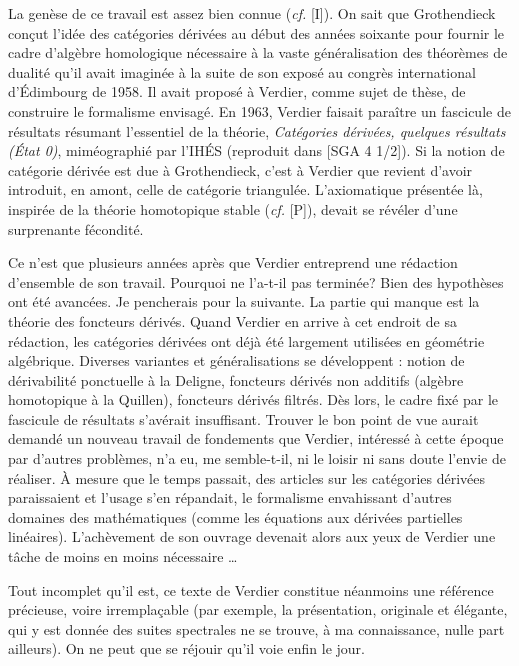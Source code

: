 La genèse de ce travail est assez bien connue (\emph{cf.} [I]). On sait que
Grothendieck conçut l'idée des catégories dérivées au début des années soixante
pour fournir le cadre d'algèbre homologique nécessaire à la vaste
généralisation des théorèmes de dualité qu'il avait imaginée à la suite de son
exposé au congrès international d'Édimbourg de 1958. Il avait proposé à
Verdier, comme sujet de thèse, de construire le formalisme envisagé. En 1963,
Verdier faisait paraître un fascicule de résultats résumant l'essentiel de la
théorie, \emph{Catégories dérivées, quelques résultats (État 0)}, miméographié
par l'IHÉS (reproduit dans [SGA 4 1/2]). Si la notion de catégorie dérivée est
due à Grothendieck, c'est à Verdier que revient d'avoir introduit, en amont,
celle de catégorie triangulée. L'axiomatique présentée là, inspirée de la
théorie homotopique stable (\emph{cf.} [P]), devait se révéler d'une surprenante
fécondité.

Ce n'est que plusieurs années après que Verdier entreprend une rédaction
d'ensemble de son travail. Pourquoi ne l'a-t-il pas terminée? Bien des
hypothèses ont été avancées. Je pencherais pour la suivante. La partie qui
manque est la théorie des foncteurs dérivés. Quand Verdier en arrive à cet
endroit de sa rédaction, les catégories dérivées ont déjà été largement
utilisées en géométrie algébrique. Diverses variantes et généralisations se
développent : notion de dérivabilité ponctuelle à la Deligne, foncteurs dérivés
non additifs (algèbre homotopique à la Quillen), foncteurs dérivés filtrés. Dès
lors, le cadre fixé par le fascicule de résultats s'avérait insuffisant.
Trouver le bon point de vue aurait demandé un nouveau travail de fondements
que Verdier, intéressé à cette époque par d'autres problèmes, n'a eu, me
semble-t-il, ni le loisir ni sans doute l'envie de réaliser. À mesure que le
temps passait, des articles sur les catégories dérivées paraissaient et l'usage
s'en répandait, le formalisme envahissant d'autres domaines des mathématiques
(comme les équations aux dérivées partielles linéaires). L'achèvement de son
ouvrage devenait alors aux yeux de Verdier une tâche de moins en moins
nécessaire \ldots{}

Tout incomplet qu'il est, ce texte de Verdier constitue néanmoins une
référence précieuse, voire irremplaçable (par exemple, la présentation,
originale et élégante, qui y est donnée des suites spectrales ne se trouve, à
ma connaissance, nulle part ailleurs). On ne peut que se réjouir qu'il voie
enfin le jour.

